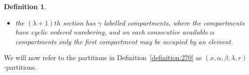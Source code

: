 \documentclass[12pt]{amsart}
\newtheorem{proof 1}{proof 1}
\newtheorem{definition}{Definition}[section]
\begin{document}
\begin{definition}
\begin{itemize}
\begin{enumerate}
		\item  in each of the $k_i$ blocks, compartments have cyclic ordered numbering,
		\item in each of the $k_i$ blocks each compartment may be occupied by at most one element,
		\item on each of the $k_i$ blocks in each consecutive available $\alpha$ compartments only the first compartment may be occupied by an element,
		\item in each of the sections the $k_i+r$ blocks are linearly ordered such that the $r$ singletons are in different cycles, and none of the blocks are fixed where the standard form is used as point of reference, 
		\item where each $k_i$ running from 0 to $\lambda_i$,
	\end{enumerate}
\item	the $(\lambda+1)th$ section has $\gamma$ labelled compartments, where the compartments have cyclic ordered numbering, and on each consecutive available $\alpha$ compartments only the first compartment may be occupied by an element.
	\end{itemize}
\end{definition}



We will now refer to the partitions in Definition~\ref{definition:270} as $(x,\alpha,\beta,\lambda,r)$-partitions. 
\end{document}
